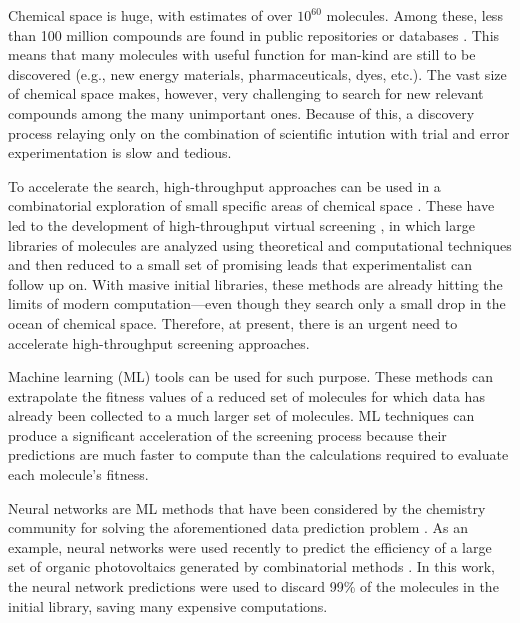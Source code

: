 \documentclass{pnastwo}
\begin{document}
\begin{article}
Chemical space is huge, with estimates of over $10^{60}$ molecules. Among
these, less than 100 million compounds are found in public repositories or
databases \cite{reymond_enumeration_2012}. This means that many molecules with
useful function for man-kind are still to be discovered (e.g., new energy
materials, pharmaceuticals, dyes, etc.). The vast size of chemical space makes,
however, very challenging to search for new relevant compounds among the many
unimportant ones. Because of this, a discovery process relaying only on
the combination of scientific intution with trial and error experimentation is slow and tedious.

To accelerate the search, high-throughput approaches can be used in a
combinatorial exploration of small specific areas of chemical space
\cite{rajan_combinatorial_2008}. These have led to the development of
high-throughput virtual screening
\cite{pyzer-knapp_what_2015,halls_highthroughput_2010,
curtarolo_highthroughput_2013,husch_largescale_2015,subramaniam_virtual_2008,shoichet_virtual_2004,
jain_commentary_2013}, in which large libraries of molecules are analyzed using
theoretical and computational techniques and then reduced to a small set of
promising leads that experimentalist can follow up on. With masive initial libraries, these methods are already
hitting the limits of modern computation---even though they search only a small
drop in the ocean of chemical space. Therefore, at present, there is an urgent
need to accelerate high-throughput screening approaches.

Machine learning (ML) tools can be used for such purpose. These methods can
extrapolate the fitness values of a reduced set of molecules for which data has
already been collected to a much larger set of molecules.  ML techniques can
produce a significant acceleration of the screening process because their
predictions are much faster to compute than the calculations required to
evaluate each molecule's fitness.

Neural networks are ML methods that have been considered by the chemistry
community for solving the aforementioned data prediction problem
\cite{zupan_neural_1991, burden_using_1996,
rodemerck_application_2004,myint_molecular_2012,DuvMacetal15nfp}. As an example, neural networks  were used
recently to predict the efficiency of a large set of organic
photovoltaics generated by combinatorial methods
\cite{pyzer-knapp_learning_2015-1}. In this work, the neural network
predictions were used to discard 99\% of the molecules in the initial
library, saving many expensive computations.


\end{article}
\end{document}
